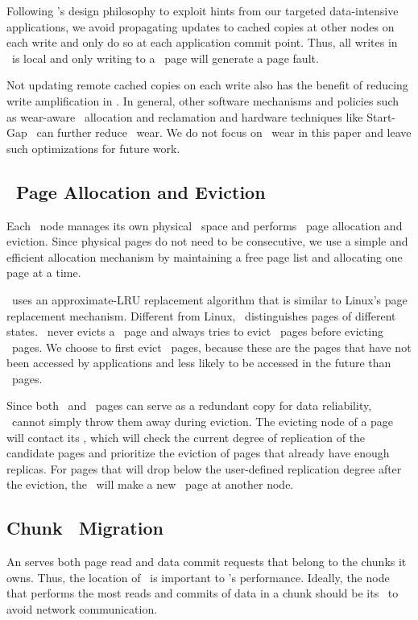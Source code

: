 Following \hotpot's design philosophy to exploit hints from our targeted data-intensive applications,
we avoid propagating updates to cached copies at other nodes on each write and only do so at each application commit point.
Thus, all writes in \hotpot\ is local and only writing to a \committed\ page will generate a page fault.

Not updating remote cached copies on each write also has the benefit of reducing write amplification in \nvm.
In general, other software mechanisms and policies such as wear-aware \nvm\ allocation and reclamation 
and hardware techniques like Start-Gap~\cite{start-gap-micro09}
can further reduce \nvm\ wear.
We do not focus on \nvm\ wear in this paper and leave such optimizations for future work.

\subsection{\nvm\ Page Allocation and Eviction}
\label{sec:hotpot:eviction}
Each \hotpot\ node manages its own physical \nvm\ space and performs \nvm\ page allocation and eviction.
Since physical pages do not need to be consecutive,
we use a simple and efficient allocation mechanism by maintaining a free page list
and allocating one page at a time.

\hotpot\ uses an approximate-LRU replacement algorithm that is similar to Linux's page replacement mechanism.
Different from Linux,
\hotpot\ distinguishes pages of different states.
\hotpot\ never evicts a \dirty\ page
and always tries to evict \redundant\ pages before evicting \committed\ pages.
We choose to first evict \redundant\ pages, 
because these are the pages that have not been accessed by applications
and less likely to be accessed in the future than \committed\ pages. %

Since both \redundant\ and \committed\ pages can serve as a redundant copy
for data reliability, \hotpot\ cannot simply throw them away during eviction.
The evicting node of a page will contact its \on{}, 
which will check the current degree of replication of the candidate pages 
and prioritize the eviction of pages that already have enough replicas. 
For pages that will drop below the user-defined replication degree after the eviction, 
the \on\ will make a new \redundant\ page at another node. %

\subsection{Chunk \on\ Migration}
\label{sec:hotpot:migration}
An \on{} serves both page read and data commit requests that belong to the chunks it owns.
Thus, the location of \on\ is important to \hotpot's performance.
Ideally, the node that performs the most reads and commits of data in a chunk 
should be its \on\ to avoid network communication.

